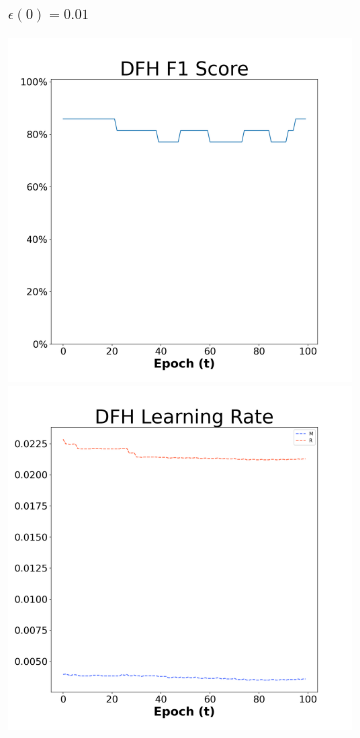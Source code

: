 \begin{figure}[H]
\begin{subfigure}{0.3\textwidth}
  \caption{$\epsilon(0)=0.01$}
\end{subfigure}\hfil %
\begin{subfigure}{0.3\textwidth}
  \includegraphics[width=\linewidth]{images/exper2/Sonar/DFH_0.03_f1.png}
  \includegraphics[width=\linewidth]{images/exper2/Sonar/DFH_0.03_lr.png}

\end{subfigure}
\end{figure}
